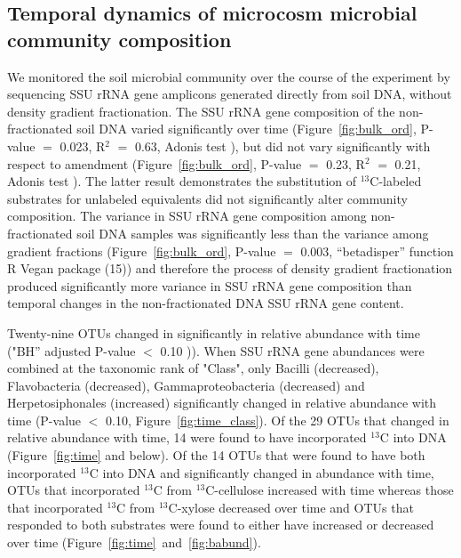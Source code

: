 \subsection{Temporal dynamics of microcosm microbial community composition}
We monitored the soil microbial community over the course of the experiment by
sequencing SSU rRNA gene amplicons generated directly from soil DNA, without
density gradient fractionation. The SSU rRNA gene composition of the
non-fractionated soil DNA varied significantly over time (Figure~\ref{fig:bulk_ord},
P-value $=$ 0.023, R$^{2}$ $=$ 0.63, Adonis test \citet{Anderson2001a}), but did not
vary significantly with respect to amendment (Figure~\ref{fig:bulk_ord}, P-value $=$ 0.23, R$^{2}$
$=$ 0.21, Adonis test \citet{Anderson2001a}). The latter result demonstrates the substitution
of $^{13}$C-labeled substrates for unlabeled equivalents did not
significantly alter community composition. The variance in SSU rRNA gene
composition among non-fractionated soil DNA samples was significantly less
than the variance among gradient fractions (Figure~\ref{fig:bulk_ord}, P-value $=$ 0.003,
“betadisper” function R Vegan package \citet{oksanen2007vegan} (15)) and
therefore the process of density gradient fractionation produced
significantly more variance in SSU rRNA gene composition than temporal
changes in the non-fractionated DNA SSU rRNA gene content.

Twenty-nine OTUs changed in significantly in relative abundance with time
("BH” adjusted P-value $<$ 0.10 \citet{YBenjamini1995})). When SSU rRNA
gene abundances were combined at the taxonomic rank of "Class", only
Bacilli (decreased), Flavobacteria (decreased), Gammaproteobacteria
(decreased) and Herpetosiphonales (increased) significantly changed in
relative abundance with time (P-value $<$ 0.10, Figure~\ref{fig:time_class}). Of
the 29 OTUs that changed in relative abundance with time, 14 were found to
have incorporated $^{13}$C into DNA (Figure~\ref{fig:time} and below). Of
the 14 OTUs that were found to have both incorporated $^{13}$C into DNA
and significantly changed in abundance with time, OTUs that incorporated
$^{13}$C from $^{13}$C-cellulose increased with time whereas those that
incorporated $^{13}$C from $^{13}$C-xylose decreased over time and OTUs
that responded to both substrates were found to either have increased or
decreased over time (Figure~\ref{fig:time}~and~\ref{fig:babund}).

